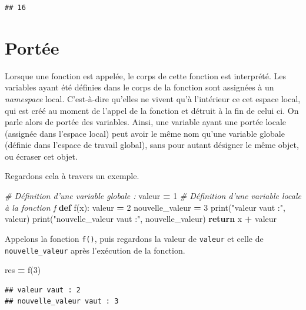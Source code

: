 \documentclass[12pt,]{book}
\newenvironment{Shaded}{\begin{snugshade}}{\end{snugshade}}
\newcommand{\KeywordTok}[1]{\textcolor[rgb]{0.13,0.29,0.53}{\textbf{#1}}}
\newcommand{\DecValTok}[1]{\textcolor[rgb]{0.00,0.00,0.81}{#1}}
\newcommand{\StringTok}[1]{\textcolor[rgb]{0.31,0.60,0.02}{#1}}
\newcommand{\CommentTok}[1]{\textcolor[rgb]{0.56,0.35,0.01}{\textit{#1}}}
\newcommand{\ControlFlowTok}[1]{\textcolor[rgb]{0.13,0.29,0.53}{\textbf{#1}}}
\newcommand{\OperatorTok}[1]{\textcolor[rgb]{0.81,0.36,0.00}{\textbf{#1}}}
\newcommand{\BuiltInTok}[1]{#1}
\newcommand{\NormalTok}[1]{#1}
\numberwithin{equation}{section}
\numberwithin{countremarque}{section}
\begin{document}
\begin{lstlisting}
## 16
\end{lstlisting}

\section{Portée}\label{portee}

Lorsque une fonction est appelée, le corps de cette fonction est
interprété. Les variables ayant été définies dans le corps de la
fonction sont assignées à un \emph{namespace} local. C'est-à-dire
qu'elles ne vivent qu'à l'intérieur ce cet espace local, qui est créé au
moment de l'appel de la fonction et détruit à la fin de celui ci. On
parle alors de portée des variables. Ainsi, une variable ayant une
portée locale (assignée dans l'espace local) peut avoir le même nom
qu'une variable globale (définie dans l'espace de travail global), sans
pour autant désigner le même objet, ou écraser cet objet.

Regardons cela à travers un exemple.

\begin{Shaded}
\begin{Highlighting}[]
\CommentTok{# Définition d'une variable globale :}
\NormalTok{valeur }\OperatorTok{=} \DecValTok{1}
\CommentTok{# Définition d'une variable locale à la fonction f}
\KeywordTok{def}\NormalTok{ f(x):}
\NormalTok{  valeur }\OperatorTok{=} \DecValTok{2}
\NormalTok{  nouvelle_valeur }\OperatorTok{=} \DecValTok{3}
  \BuiltInTok{print}\NormalTok{(}\StringTok{"valeur vaut :"}\NormalTok{, valeur)}
  \BuiltInTok{print}\NormalTok{(}\StringTok{"nouvelle_valeur vaut :"}\NormalTok{, nouvelle_valeur)}
  \ControlFlowTok{return}\NormalTok{ x }\OperatorTok{+}\NormalTok{ valeur}
\end{Highlighting}
\end{Shaded}

Appelons la fonction \texttt{f()}, puis regardons la valeur de
\texttt{valeur} et celle de \texttt{nouvelle\_valeur} après l'exécution
de la fonction.

\begin{Shaded}
\begin{Highlighting}[]
\NormalTok{res }\OperatorTok{=}\NormalTok{ f(}\DecValTok{3}\NormalTok{)}
\end{Highlighting}
\end{Shaded}

\begin{lstlisting}
## valeur vaut : 2
## nouvelle_valeur vaut : 3
\end{lstlisting}
\end{document}
